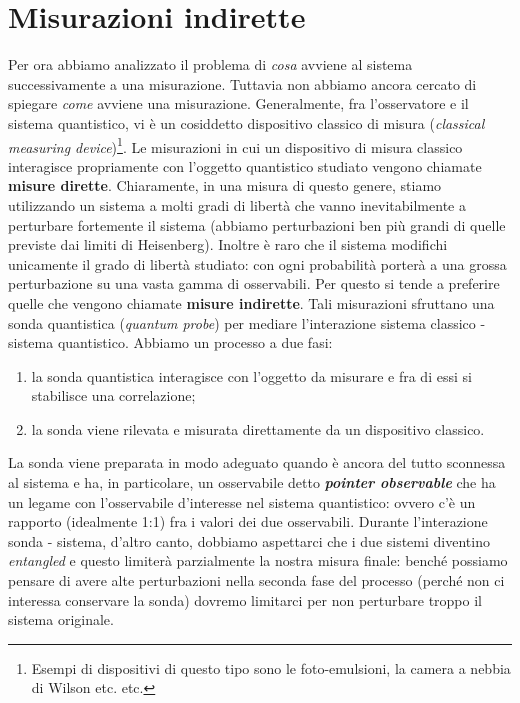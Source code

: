 \vspace{0.5cm}

\noindent  {}

\section{Misurazioni indirette}\label{sec:mis_ind}

Per ora abbiamo analizzato il problema di \textit{cosa} avviene al sistema successivamente a una misurazione. Tuttavia non abbiamo ancora cercato di spiegare \textit{come} avviene una misurazione.
Generalmente, fra l'osservatore e il sistema quantistico, vi è un cosiddetto dispositivo classico di misura (\textit{classical measuring device})\footnote{Esempi di dispositivi di questo tipo sono le foto-emulsioni, la camera a nebbia di Wilson etc. etc.}. Le misurazioni in cui un dispositivo di misura classico interagisce propriamente con l'oggetto quantistico studiato vengono chiamate \textbf{misure dirette}. 
Chiaramente, in una misura di questo genere, stiamo utilizzando un sistema a molti gradi di libertà che vanno inevitabilmente a perturbare fortemente il sistema (abbiamo perturbazioni ben più grandi di quelle previste dai limiti di Heisenberg). Inoltre è raro che il sistema modifichi unicamente il grado di libertà studiato: con ogni probabilità porterà a una grossa perturbazione su una vasta gamma di osservabili.
Per questo si tende a preferire quelle che vengono chiamate \textbf{misure indirette}. Tali misurazioni sfruttano una sonda quantistica (\textit{quantum probe}) per mediare l'interazione sistema classico - sistema quantistico.
Abbiamo un processo a due fasi:
\begin{enumerate}
    \item la sonda quantistica interagisce con l'oggetto da misurare e fra di essi si stabilisce una correlazione;
    \item la sonda viene rilevata e misurata direttamente da un dispositivo classico.
\end{enumerate}
\noindent La sonda viene preparata in modo adeguato quando è ancora del tutto sconnessa al sistema e ha, in particolare, un osservabile detto \textbf{\textit{pointer observable}} che ha un legame con l'osservabile d'interesse nel sistema quantistico: ovvero c'è un rapporto (idealmente 1:1) fra i valori dei due osservabili.
Durante l'interazione sonda - sistema, d'altro canto, dobbiamo aspettarci che i due sistemi diventino \textit{entangled} e questo limiterà parzialmente la nostra misura finale: benché possiamo pensare di avere alte perturbazioni nella seconda fase del processo (perché non ci interessa conservare la sonda) dovremo limitarci per non perturbare troppo il sistema originale.
